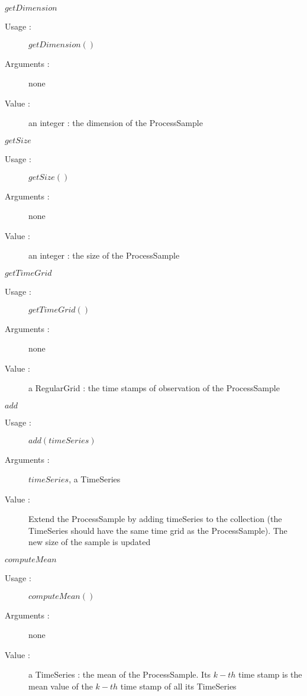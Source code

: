 \begin{description}
\begin{description}
  \item $getDimension$
    \begin{description}
    \item[Usage :] $getDimension()$
    \item[Arguments :] none
    \item[Value :] an integer : the dimension of the ProcessSample
    \end{description}
    \bigskip

  \item $getSize$
    \begin{description}
    \item[Usage :] $getSize()$
    \item[Arguments :] none
    \item[Value :] an integer : the size of the ProcessSample
    \end{description}
    \bigskip

  \item $getTimeGrid$
    \begin{description}
    \item[Usage :] $getTimeGrid()$
    \item[Arguments :] none
    \item[Value :] a RegularGrid : the time stamps of observation of the ProcessSample
    \end{description}
    \bigskip


  \item $add$
    \begin{description}
    \item[Usage :] $add(timeSeries)$
    \item[Arguments :] $timeSeries$, a TimeSeries
    \item[Value :] Extend the ProcessSample by adding timeSeries to the collection (the TimeSeries should have the same time grid as the ProcessSample). The new size of the sample
 is updated
    \end{description}
    \bigskip

  \item $computeMean$
    \begin{description}
    \item[Usage :] $computeMean()$
    \item[Arguments :] none
    \item[Value :] a TimeSeries : the mean of the ProcessSample. Its $k-th$ time stamp is the mean value of the $k-th$ time stamp of all its TimeSeries
    \end{description}
    \bigskip


\end{description}
\end{description}
